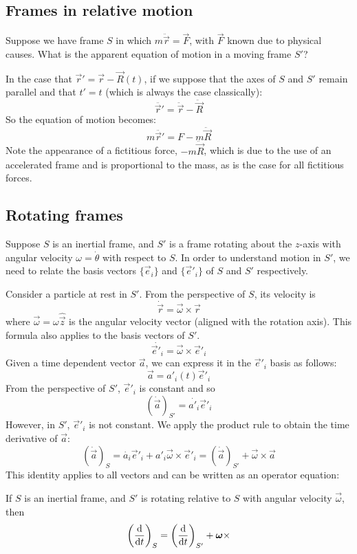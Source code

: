 \documentclass[a4paper]{article}
\begin{document}
\subsection{Frames in relative motion}%
Suppose we have frame $S$ in which $m\ddot{\vec{r}}=\vec{F}$, with $\vec{F}$ known due to physical causes. What is the apparent equation of motion in a moving frame $S'$?

 In the case that $\vec{r}' = \vec{r} - \vec{R}(t)$, if we
 suppose that the axes of $S$ and $S'$ remain parallel and that
 $t'=t$ (which is always the case classically):
 $$\ddot{\vec{r}'} = \ddot{\vec{r}} - \ddot{\vec{R}}$$
 So the equation of motion becomes:
 $$m\ddot{\vec{r}'} = F - m\ddot{\vec{R}}$$
 Note the appearance of a fictitious force, $-m\ddot{\vec{R}}$, which is due to the use of an accelerated frame and is proportional to the mass, as is the case for all fictitious forces.

 
\subsection{Rotating frames}
Suppose $S$ is an inertial frame, and $S'$ is a frame rotating about the $z$-axis with angular velocity $\omega = \dot{\theta}$ with respect to $S$.
In order to understand motion in $S'$, we need to relate the basis vectors $\{\vec{e}_i\}$ and $\{\vec{e}'_i\}$ of $S$ and $S'$ respectively.

Consider a particle at rest in $S'$. From the perspective of $S$, its velocity is
$$\dot{\vec{r}} = \vec{\omega} \times \vec{r}$$
where $\vec{\omega} = \omega \hat{\vec{z}}$ is the angular velocity vector (aligned with the rotation axis). This formula also applies to the basis vectors of $S'$.
$$\dot{\vec{e}'_i} = \vec{\omega} \times \vec{e}'_i$$
Given a time dependent vector $\vec{a}$, we can express it in the $\vec{e}'_i$ basis as follows:
$$\vec{a} = a'_i(t) \vec{e}'_i$$
From the perspective of $S'$, $\vec{e}'_i$ is constant and so
$$\left(\dot{\vec{a}}\right)_{S'} = \dot{a'_i} \vec{e}'_i$$
However, in $S'$, $\vec{e}'_i$ is not constant. We apply the product rule to obtain the time derivative of $\vec{a}$:
$$\left(\dot{\vec{a}}\right)_S = \dot{a_i} \vec{e}'_i + a'_i \vec{\omega} \times \vec{e}'_i = \left(\dot{\vec{a}}\right)_{S'} + \vec{\omega} \times \vec{a}$$
This identity applies to all vectors and can be written as an operator equation:
\begin{prop}
  If $S$ is an inertial frame, and $S'$ is rotating relative to $S$ with angular velocity $\vec{\omega}$, then
  $$\left(\frac{\mathrm{d}}{\mathrm{d} t}\right)_S = \left(\frac{\mathrm{d}}{\mathrm{d} t}\right)_{S'} + \boldsymbol{\mathbf{\omega}} \times$$
\end{prop}
\end{document}
